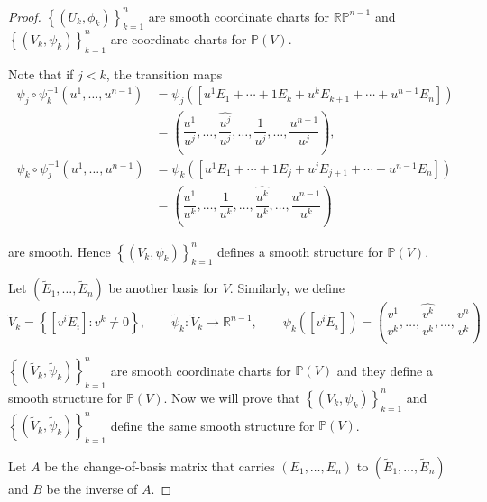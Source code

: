 \begin{proof}
    \( {\left\{ (U_{k}, \phi_{k}) \right\}}_{k=1}^{n} \) are smooth coordinate charts for \( \mathbb{RP}^{n-1} \) and \( {\left\{ (V_{k}, \psi_{k}) \right\}}_{k=1}^{n} \) are coordinate charts for \( \mathbb{P}(V) \).

    Note that if \( j < k \), the transition maps
    \begingroup
    \allowdisplaybreaks%
    \begin{align*}
        \psi_{j} \circ \psi_{k}^{-1}(u^{1}, \ldots, u^{n-1}) & = \psi_{j}([u^{1}E_{1} + \cdots + 1E_{k} + u^{k}E_{k+1} + \cdots + u^{n-1}E_{n}])                                                        \\
                                                             & = \left( \dfrac{u^{1}}{u^{j}}, \ldots, \widehat{\dfrac{u^{j}}{u^{j}}}, \ldots, \dfrac{1}{u^{j}}, \ldots, \dfrac{u^{n-1}}{u^{j}} \right), \\
        \psi_{k} \circ \psi_{j}^{-1}(u^{1}, \ldots, u^{n-1}) & = \psi_{k}([u^{1}E_{1} + \cdots + 1E_{j} + u^{j}E_{j+1} + \cdots + u^{n-1}E_{n}])                                                        \\
                                                             & = \left( \dfrac{u^{1}}{u^{k}}, \ldots, \dfrac{1}{u^{k}}, \ldots, \widehat{\dfrac{u^{k}}{u^{k}}}, \ldots, \dfrac{u^{n-1}}{u^{k}} \right)
    \end{align*}
    \endgroup

    are smooth. Hence \( {\left\{ (V_{k}, \psi_{k}) \right\}}_{k=1}^{n} \) defines a smooth structure for \( \mathbb{P}(V) \).

    Let \( (\widetilde{E}_{1}, \ldots, \widetilde{E}_{n}) \) be another basis for \( V \). Similarly, we define
    \[
        \widetilde{V}_{k} = \left\{ [v^{i}\widetilde{E}_{i}]: v^{k} \ne 0 \right\}, \qquad \widetilde{\psi}_{k}: \widetilde{V}_{k} \to \mathbb{R}^{n-1}, \qquad \psi_{k}([v^{i}\widetilde{E}_{i}]) = \left( \dfrac{v^{1}}{v^{k}}, \ldots, \widehat{\dfrac{v^{k}}{v^{k}}}, \ldots, \dfrac{v^{n}}{v^{k}} \right)
    \]

    \( {\left\{ (\widetilde{V}_{k}, \widetilde{\psi}_{k}) \right\}}_{k=1}^{n} \) are smooth coordinate charts for \( \mathbb{P}(V) \) and they define a smooth structure for \( \mathbb{P}(V) \). Now we will prove that \( {\left\{ (V_{k}, \psi_{k}) \right\}}_{k=1}^{n} \) and \( {\left\{ (\widetilde{V}_{k}, \widetilde{\psi}_{k}) \right\}}_{k=1}^{n} \) define the same smooth structure for \( \mathbb{P}(V) \).

    Let \( A \) be the change-of-basis matrix that carries \( (E_{1}, \ldots, E_{n}) \) to \( (\widetilde{E}_{1}, \ldots, \widetilde{E}_{n}) \) and \( B \) be the inverse of \( A \).


\end{proof}
